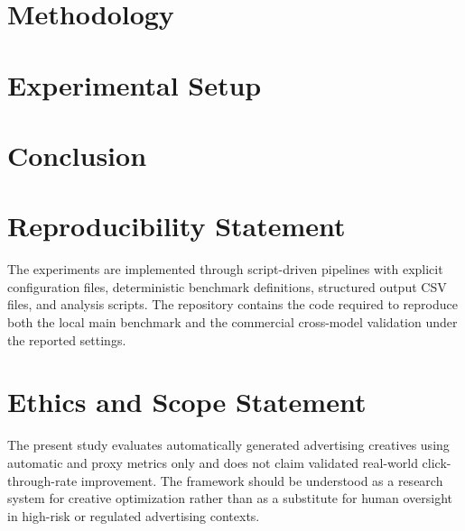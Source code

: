 \documentclass[preprint,12pt]{elsarticle}
\begin{document}
\section{Methodology}

\section{Experimental Setup}




\section{Conclusion}

\section*{Reproducibility Statement}
The experiments are implemented through script-driven pipelines with explicit configuration files, deterministic benchmark definitions, structured output CSV files, and analysis scripts. The repository contains the code required to reproduce both the local main benchmark and the commercial cross-model validation under the reported settings.

\section*{Ethics and Scope Statement}
The present study evaluates automatically generated advertising creatives using automatic and proxy metrics only and does not claim validated real-world click-through-rate improvement. The framework should be understood as a research system for creative optimization rather than as a substitute for human oversight in high-risk or regulated advertising contexts.
\end{document}
